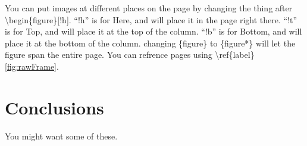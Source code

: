 \documentclass{article}
\begin{document}
You can put images at different places on the page by changing the thing after \textbackslash begin\{figure\}[!h].
``!h'' is for Here, and will place it in the page right there.
``!t'' is for Top, and will place it at the top of the column.
``!b'' is for Bottom, and will place it at the bottom of the column.
changing \{figure\} to \{figure*\} will let the figure span the entire page.
You can refrence pages using \textbackslash ref\{label\} \ref{fig:rawFrame}.





\section{Conclusions}
You might want some of these.





\end{document}
